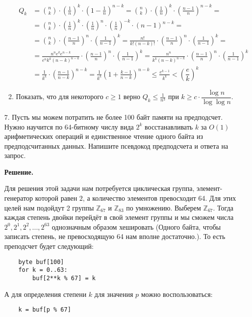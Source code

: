 \begin{enumerate}
\begin{enumerate}
		\begin{align*}
			Q_k &= \binom{n}{k}\cdot \left( \frac{1}{n} \right)^k \cdot \left(1 - \frac{1}{n} \right)^{n-k} =
			\binom{n}{k}\cdot \left( \frac{1}{n} \right)^k \cdot \left(\frac{n-1}{n} \right)^{n-k} = \\
			&=\binom{n}{k} \cdot \left( \frac{1}{n} \right)^k \cdot \left( \frac{1}{n} \right)^n \cdot \left( 
			\frac{1}{n} \right)^{-k} \cdot (n - 1)^{n - k} = \\
			&=\binom{n}{k} \cdot \left( \frac{n - 1}{n} \right)^n \cdot \left(\frac{1}{n - 1} \right)^{k} =
			 \frac{n!}{k!(n-k)!} \cdot \left( \frac{n - 1}{n} \right)^n \cdot \left(\frac{1}{n - 1} \right)^{k} 
			 =\\
			&= \frac{n^n e^k e^{n - k}}{e^n k^k (n-k)^{n-k}}\cdot \left( \frac{n - 1}{n} \right)^n \cdot \left(\frac{1}{n - 1} \right)^{k} = \frac{n^n}{k^k (n-k)^{n-k}}\cdot \left( \frac{n - 1}{n} \right)^n \cdot \left(\frac{1}{n - 1} \right)^{k}\\
			&= \frac{1}{k^k} \cdot \left( \frac{n - 1}{n - k} \right)^{n - k} = \frac{1}{k^k} \left( 1+ \frac{k - 
				1}{n - k} \right)^{n - k} \leqslant \frac{e^{k - 1}}{k^k} < \left(\dfrac{e}{k}\right)^k
		\end{align*}
		
		\item Показать, что для некоторого $c \ge 1$ верно $Q_k \leqslant \frac{1}{n^3}$ при  $k\geqslant c \cdot \dfrac{\log n}{\log \log n}$.
	\end{enumerate}
	
	\item[7.] Пусть мы можем потратить не более 100 байт памяти на предподсчет. Нужно научится по 64-битному 
	числу вида $2^k$ восстанавливать $k$ за $O(1)$ арифметических операций и единственное
	чтение одного байта из предподсчитанных данных. Напишите псевдокод предподсчета и ответа на 
	запрос.
	
	\textbf{Решение.}
	
	Для решения этой задачи нам потребуется циклическая группа, элемент-генератор которой равен $2$, а количество 
	элементов превосходит 64. Для этих целей нам подойдут 2 группы $\mathbb{Z}_{67}$ и $\mathbb{Z}_{83}$ по 
	умножению. Выберем $\mathbb{Z}_{67}$. Тогда каждая степень двойки перейдёт в свой элемент группы и мы сможем 
	числа $2^0, 2^1, 2^2, ..., 2^{63}$ однозначным образом хешировать (Одного байта, чтобы записать степень, не превосходящую 64 нам вполне достаточно.). То есть преподсчет будет следующий:
	\begin{lstlisting}
	byte buf[100]
	for k = 0..63:
		buf[2**k % 67] = k
	\end{lstlisting}
	А для определения степени $k$ для значения $p$ можно воспользоваться:
	\begin{lstlisting}
	k = buf[p % 67]
	\end{lstlisting}
	

\end{enumerate}

